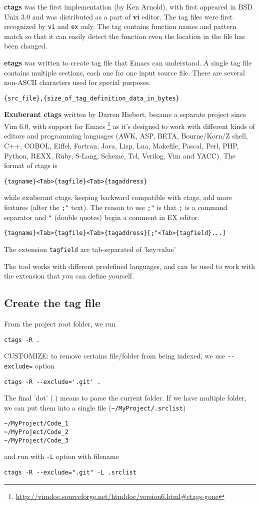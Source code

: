 {\bf ctags} was the first implementation (by Ken Arnold), with first appeared in
BSD Unix 3.0 and was distributed as a part of {\bf vi} editor. The tag files
were first recognized by \verb!vi! and \verb!ex! only. The tag contains function
names and pattern match so that it can easily detect the function even the
location in the file has been changed.

{\bf etags} was written to create tag file that Emacs can understand. A single
tag file contains multiple sections, each one for one input source file. There
are several non-ASCII characters used for special purposes.
\begin{verbatim}
{src_file},{size_of_tag_definition_data_in_bytes}
\end{verbatim}

{\bf Exuberant ctags} written by Darren Hiebert, became a separate project since
Vim 6.0, with support for Emacs
\footnote{\url{http://vimdoc.sourceforge.net/htmldoc/version6.html\#ctags-gone}}
as it's designed to work with different kinds of editors and programming
languages (AWK, ASP, BETA, Bourne/Korn/Z shell, C++, COBOL, Eiffel, Fortran,
Java, Lisp, Lua, Makefile, Pascal, Perl, PHP, Python, REXX, Ruby, S-Lang,
Scheme, Tcl, Verilog, Vim and YACC). The format of ctags is
\begin{verbatim}
{tagname}<Tab>{tagfile}<Tab>{tagaddress}
\end{verbatim}
while exuberant ctags, keeping backward compatible with ctags, add more features
(after the \verb!;"! text). The reason to use \verb!;"! is that \verb!;! is a
command separator and \verb!"! (double quotes) begin a comment in EX editor.
\begin{verbatim}
{tagname}<Tab>{tagfile}<Tab>{tagaddress}[;"<Tab>{tagfield}...]
\end{verbatim}
The extension \verb!tagfield! are tab-separated of 'key:value'

The tool works with different predefined languages, and can be used to work with
the extension that you can define yourself.

\subsection{Create the tag file}
\label{sec:ctags-create-tag}

From the project root folder, we run
\begin{verbatim}
ctags -R .
\end{verbatim}

CUSTOMIZE: to remove certains file/folder from being indexed, we use
\verb!--exclude=! option
\begin{verbatim}
ctags -R --exclude='.git' .
\end{verbatim}
The final 'dot' (.) means to parse the current folder. If we have multiple
folder, we can put them into a single file (\verb!~/MyProject/.srclist!)
\begin{verbatim}
~/MyProject/Code_1
~/MyProject/Code_2
~/MyProject/Code_3
\end{verbatim}
and run with \verb!-L! option with filename
\begin{verbatim}
ctags -R --exclude=".git" -L .srclist
\end{verbatim}

